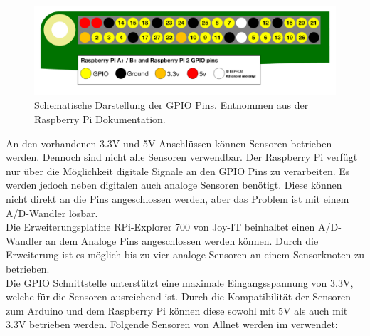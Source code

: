 \begin{figure}[ht]
	\includegraphics[width=\textwidth]{Bilder/Kapitel2/gpio_pins_pi2.png}
	\caption[Schema GPIO Pins]{Schematische Darstellung der GPIO Pins. Entnommen aus der Raspberry Pi Dokumentation\cite{GPIOMode77:online}.}
	\label{fig:Kapitel2/gpio_pins_pi2.png}
\end{figure}
\noindent
An den vorhandenen 3.3V und 5V Anschlüssen können Sensoren betrieben werden. Dennoch sind nicht alle Sensoren verwendbar. Der Raspberry Pi verfügt nur über die Möglichkeit digitale Signale an den \ac{GPIO} Pins zu verarbeiten. Es werden jedoch neben digitalen auch analoge Sensoren benötigt. Diese können nicht direkt an die Pins angeschlossen werden, aber das Problem ist mit einem \ac{A/D-Wandler} lösbar. \\
Die Erweiterungsplatine RPi-Explorer 700 von Joy-IT \cite{joyitrpi87:online} beinhaltet einen \ac{A/D-Wandler} an dem Analoge Pins angeschlossen werden können. Durch die Erweiterung ist es möglich bis zu vier analoge Sensoren an einem Sensorknoten zu betrieben. \\
Die \ac{GPIO} Schnittstelle unterstützt eine maximale Eingangsspannung von 3.3V, welche für die Sensoren ausreichend ist. Durch die Kompatibilität der Sensoren zum Arduino und dem Raspberry Pi können diese sowohl mit 5V als auch mit 3.3V betrieben werden.
Folgende Sensoren von Allnet\cite{111861pd90:online} werden im  verwendet:
